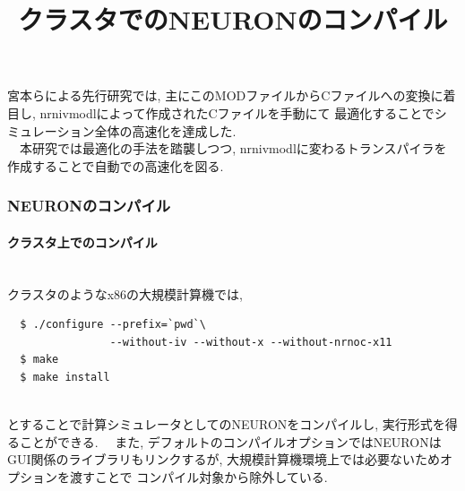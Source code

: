 宮本\cite{miyamoto-master}\cite{miyamoto-master-eng}らによる先行研究では, 主にこのMODファイルからCファイルへの変換に着目し, nrnivmodlによって作成されたCファイルを手動にて
最適化することでシミュレーション全体の高速化を達成した.\\
　本研究では最適化の手法を踏襲しつつ, nrnivmodlに変わるトランスパイラを作成することで自動での高速化を図る.\\

\subsubsection{NEURONのコンパイル}
\paragraph{クラスタ上でのコンパイル}~\\
クラスタのようなx86の大規模計算機では,\\
\begin{table}[!ht]
  \begin{center}

  \title{クラスタでのNEURONのコンパイル}
{\footnotesize
\begin{framed}
\begin{verbatim}
  $ ./configure --prefix=`pwd`\
                --without-iv --without-x --without-nrnoc-x11
  $ make
  $ make install
\end{verbatim}
\end{framed}
}
\end{center}
\end{table}
\\
とすることで計算シミュレータとしてのNEURONをコンパイルし, 実行形式を得ることができる.
　また, デフォルトのコンパイルオプションではNEURONはGUI関係のライブラリもリンクするが, 大規模計算機環境上では必要ないためオプションを渡すことで
コンパイル対象から除外している.\\
